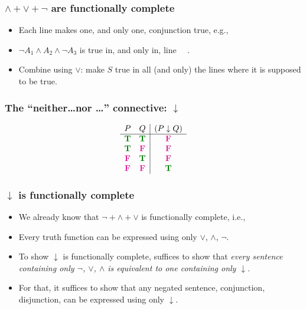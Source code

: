 \begin{frame}
  \frametitle{$\land + \lor + \lnot$ are functionally complete}

\begin{itemize}[<+->]
\item Each line makes one, and only one, conjunction true, e.g.,
\item $\lnot A_1 \land A_2 \land \lnot A_3$ is true in, and only in, line \False\ \True\ \False.
\item Combine using $\lor$: make $S$ true in all (and only) the lines where it is supposed to be true.
\end{itemize}
\end{frame}

\begin{frame}
    \frametitle{The ``neither\dots nor \dots'' connective: $\downarrow$}

\[
\begin{array}{cc|c}
P & Q & (P \downarrow Q)\\
\hline
\True & \True & \False\\
\True & \False & \False\\
\False & \True & \False\\
\False & \False & \True
\end{array}
\]

\end{frame}

\begin{frame}
  \frametitle{$\downarrow$ is functionally complete}

\begin{itemize}[<+->]
\item We already know that ${\lnot} + {\land} + {\lor}$ is functionally complete, i.e.,
\item Every truth function can be expressed using only $\lor$, $\land$, $\lnot$.
\item To show $\downarrow$ is functionally complete, suffices to
  show that \emph{every sentence containing only $\lnot$, $\lor$, $\land$ is
   equivalent to one containing only $\downarrow$}.
\item For that, it suffices to show that any negated sentence,
  conjunction, disjunction, can be expressed using only $\downarrow$.
\end{itemize}

\end{frame}

